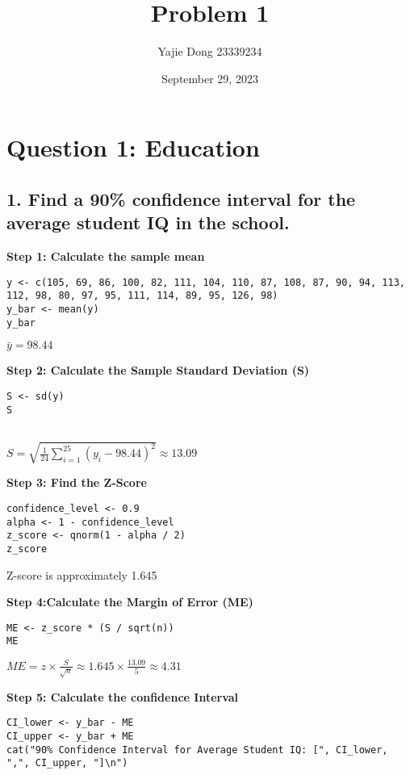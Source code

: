 \documentclass[12pt]{article}
\title{Problem 1}
\date{September 29, 2023}
\author{Yajie Dong 23339234}
\begin{document}
\maketitle

\section*{Question 1: Education}

\subsection*{1. Find a 90\% confidence interval for the average student IQ in the school.}

\textbf{Step 1: Calculate the sample mean}

\begin{lstlisting}[style=my]
y <- c(105, 69, 86, 100, 82, 111, 104, 110, 87, 108, 87, 90, 94, 113, 112, 98, 80, 97, 95, 111, 114, 89, 95, 126, 98)
y_bar <- mean(y)
y_bar
\end{lstlisting}

$\bar{y} = 98.44$

\textbf{Step 2: Calculate the Sample Standard Deviation (S)}
\begin{lstlisting}[style=my]
S <- sd(y)
S
    
\end{lstlisting}
\vspace{12pt}
$S = \sqrt{\frac{1}{24} \sum_{i=1}^{25}(y_i-98.44)^2} \approx 13.09$
\vspace{12pt}


\textbf{Step 3: Find the Z-Score}
\begin{lstlisting}[style=my]
confidence_level <- 0.9
alpha <- 1 - confidence_level
z_score <- qnorm(1 - alpha / 2)
z_score
\end{lstlisting}
\vspace{12pt}
Z-score is approximately 1.645 
\vspace{12pt}

\textbf{Step 4:Calculate the Margin of Error (ME)}
\begin{lstlisting}[style=my]
ME <- z_score * (S / sqrt(n))
ME
\end{lstlisting}
\vspace{12pt}
$ME = z \times \frac{S}{\sqrt{n}} \approx 1.645 \times \frac{13.09}{5} \approx 4.31$

\vspace{12pt}
\textbf{Step 5: Calculate the confidence Interval}
\begin{lstlisting}[style=my]
CI_lower <- y_bar - ME
CI_upper <- y_bar + ME
cat("90% Confidence Interval for Average Student IQ: [", CI_lower, ",", CI_upper, "]\n")

\end{lstlisting}
\end{document}

